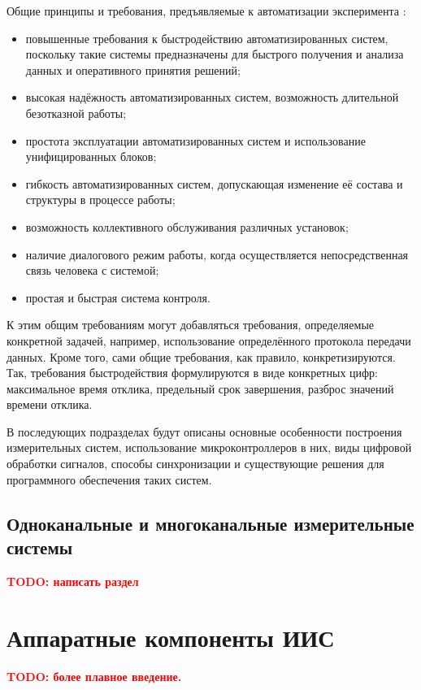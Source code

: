 \documentclass[a4paper, 14pt, titlepage]{extarticle}
\newcommand{\todo}[1]{\textbf{\textcolor{red}{TODO: #1}}}
\let\oldsection\section
\renewcommand{\section}{\newpage\oldsection}
\begin{document}
  Общие принципы и требования, предъявляемые к автоматизации эксперимента \cite{vinogradov-discrete, kurochkin-kamak}:
  \begin{itemize}
    \item повышенные требования к быстродействию автоматизированных систем, поскольку такие системы
      предназначены для быстрого получения и анализа данных и оперативного принятия решений;
    \item высокая надёжность автоматизированных систем, возможность длительной безотказной работы;
    \item простота эксплуатации автоматизированных систем и использование унифицированных блоков;
    \item гибкость автоматизированных систем, допускающая изменение её состава и структуры в процессе работы;
    \item возможность коллективного обслуживания различных установок;
    \item наличие диалогового режим работы, когда осуществляется непосредственная связь человека с системой;
    \item простая и быстрая система контроля.
  \end{itemize}

  К этим общим требованиям могут добавляться требования, определяемые конкретной задачей, например,
  использование определённого протокола передачи данных. Кроме того, сами общие требования, как
  правило, конкретизируются. Так, требования быстродействия формулируются в виде конкретных цифр:
  максимальное время отклика, предельный срок завершения, разброс значений времени отклика.

  В последующих подразделах будут описаны основные особенности построения измерительных систем,
  использование микроконтроллеров в них, виды цифровой обработки сигналов, способы синхронизации и
  существующие решения для программного обеспечения таких систем.

  \subsection{Одноканальные и многоканальные измерительные системы}

  \todo{написать раздел}

  \section{Аппаратные компоненты ИИС}

  \todo{более плавное введение.}
\end{document}
